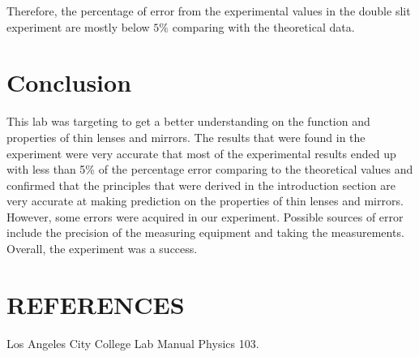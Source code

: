 \documentclass[12pt]{article}
\begin{document}
Therefore, the percentage of error from the experimental values in the double slit experiment are mostly below $5\%$ comparing with the theoretical data.

\begin{multicols}{2}

\section*{Conclusion}
This lab was targeting to get a better understanding on the function and properties of thin lenses and mirrors. The results that were found in the experiment were very accurate that most of the  experimental results ended up with less than 5\% of the percentage error comparing to the theoretical values and confirmed that the principles that were derived in the introduction section are very accurate at making prediction on the properties of thin lenses and mirrors. 
However, some errors were acquired in our experiment. Possible sources of error include the precision of the measuring equipment and taking the measurements. Overall, the experiment was a success.

\section*{REFERENCES}
Los Angeles City College Lab Manual Physics 103. 

\end{multicols}
\end{document}
